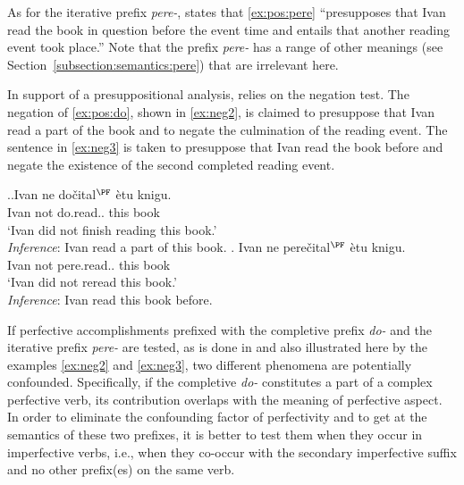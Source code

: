 As for the iterative prefix \textit{pere-}, \citet[145]{Kagan:book} states that \ref{ex:pos:pere} ``presupposes that Ivan read the book in question before the event time and entails that another reading event took place.'' Note that the prefix \textit{pere-} has a range of other meanings (see Section~\ref{subsection:semantics:pere}) that are irrelevant here.

In support of a presuppositional analysis, \citet{Kagan:book} relies on the negation test. The negation of \ref{ex:pos:do}, shown in \ref{ex:neg2}, is claimed to presuppose that Ivan read a part of the book and to negate the culmination of the reading event. The sentence in \ref{ex:neg3} is taken to presuppose that Ivan read the book before and negate the existence of the second completed reading event.

\ex.\ag.\label{ex:neg2}Ivan ne do\v{c}ital$^{\PF}$ \`{e}tu knigu.\\
Ivan not do.read.. this book\\
\trans `Ivan did not finish reading this book.'\\
\textit{Inference}: Ivan read a part of this book.
\bg. \label{ex:neg3}Ivan ne pere\v{c}ital$^{\PF}$ \`{e}tu knigu.\\
Ivan not pere.read.. this book\\
\trans `Ivan did not reread this book.'\\
\textit{Inference}: Ivan read this book before.

If perfective accomplishments prefixed with the completive prefix \textit{do-} and the iterative prefix \textit{pere-} are tested, as is done in \citealt{Kagan:book} and also illustrated here by the examples \ref{ex:neg2} and \ref{ex:neg3}, two different phenomena are potentially confounded. Specifically, if the completive \textit{do-} constitutes a part of a complex perfective verb, its contribution overlaps with the meaning of perfective aspect. In order to eliminate the confounding factor of perfectivity and to get at the semantics of these two prefixes, it is better to test them when they occur in imperfective verbs, i.e., when they co-occur with the secondary imperfective suffix and no other prefix(es) on the same verb.

